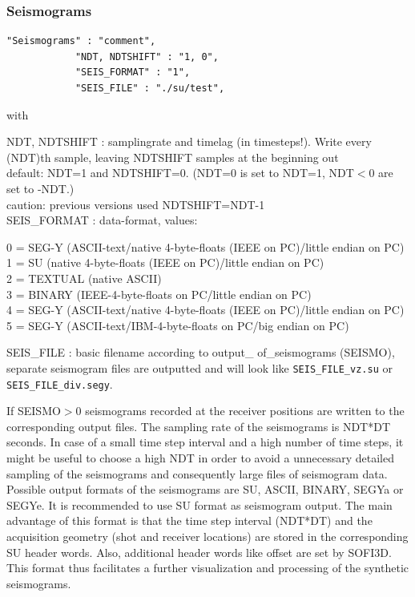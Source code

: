 \documentclass[11pt,onecolumn,oneside]{article}
\begin{document}
\subsubsection{Seismograms}
\label{seismograms}
\begin{verbatim}
"Seismograms" : "comment",
            "NDT, NDTSHIFT" : "1, 0",
            "SEIS_FORMAT" : "1",
            "SEIS_FILE" : "./su/test",
\end{verbatim}

with

NDT, NDTSHIFT : samplingrate and timelag (in timesteps!). Write every (NDT)th sample, leaving NDTSHIFT samples at the beginning out\\
default: NDT=1 and NDTSHIFT=0. (NDT=0 is set to NDT=1, NDT$<$0 are set to -NDT.)\\
caution: previous versions used NDTSHIFT=NDT-1\\
SEIS\_FORMAT : data-format, values:
\par
\begingroup
\leftskip=0.5cm
0 = SEG-Y (ASCII-text/native 4-byte-floats (IEEE on PC)/little endian on PC)\\
1 = SU (native 4-byte-floats (IEEE on PC)/little endian on PC)\\
2 = TEXTUAL (native ASCII)\\
3 = BINARY (IEEE-4-byte-floats on PC/little endian on PC)\\
4 = SEG-Y (ASCII-text/native 4-byte-floats (IEEE on PC)/little endian on PC)\\
5 = SEG-Y (ASCII-text/IBM-4-byte-floats on PC/big endian on PC) \\
\par
\endgroup
SEIS\_FILE : basic filename according to output\_ of\_seismograms (SEISMO), separate seismogram files are outputted and will look like  \lstinline{SEIS_FILE_vz.su} or  \lstinline{SEIS_FILE_div.segy}.

If SEISMO$>$0 seismograms recorded at the receiver positions are written to the corresponding output files. The sampling rate of the seismograms is NDT*DT seconds. In case of a small
time step interval and a high number of time steps, it might be useful to choose a high NDT in order to avoid a unnecessary detailed sampling of the seismograms and consequently large files of seismogram data. Possible output formats of the seismograms are SU, ASCII, BINARY, SEGYa or SEGYe. It is recommended to use SU format as seismogram output. The main advantage of this format is that the
time step interval (NDT*DT) and the acquisition geometry (shot and receiver locations) are stored in the corresponding SU header words. Also, additional header words like offset are set by SOFI3D. This format thus facilitates a further visualization and processing of the synthetic seismograms.
\end{document}
